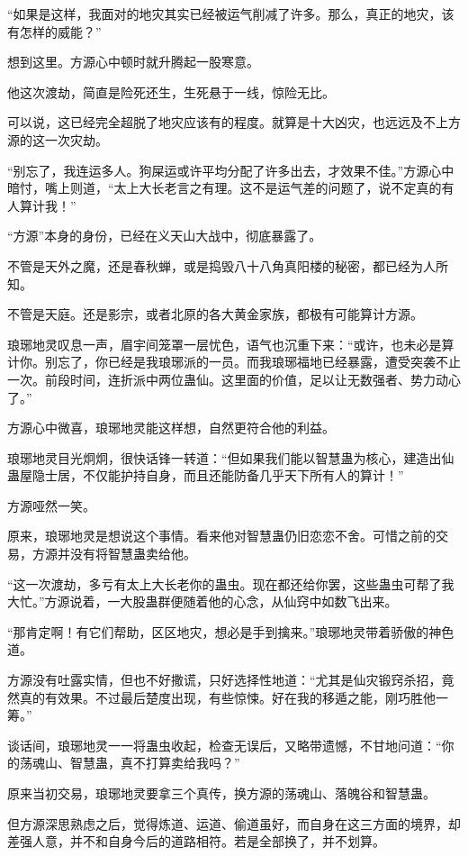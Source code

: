 \begin{this_body}
“如果是这样，我面对的地灾其实已经被运气削减了许多。那么，真正的地灾，该有怎样的威能？”

想到这里。方源心中顿时就升腾起一股寒意。

他这次渡劫，简直是险死还生，生死悬于一线，惊险无比。

可以说，这已经完全超脱了地灾应该有的程度。就算是十大凶灾，也远远及不上方源的这一次灾劫。

“别忘了，我连运多人。狗屎运或许平均分配了许多出去，才效果不佳。”方源心中暗忖，嘴上则道，“太上大长老言之有理。这不是运气差的问题了，说不定真的有人算计我！”

“方源”本身的身份，已经在义天山大战中，彻底暴露了。

不管是天外之魔，还是春秋蝉，或是捣毁八十八角真阳楼的秘密，都已经为人所知。

不管是天庭。还是影宗，或者北原的各大黄金家族，都极有可能算计方源。

琅琊地灵叹息一声，眉宇间笼罩一层忧色，语气也沉重下来：“或许，也未必是算计你。别忘了，你已经是我琅琊派的一员。而我琅琊福地已经暴露，遭受突袭不止一次。前段时间，连折派中两位蛊仙。这里面的价值，足以让无数强者、势力动心了。”

方源心中微喜，琅琊地灵能这样想，自然更符合他的利益。

琅琊地灵目光炯炯，很快话锋一转道：“但如果我们能以智慧蛊为核心，建造出仙蛊屋隐士居，不仅能护持自身，而且还能防备几乎天下所有人的算计！”

方源哑然一笑。

原来，琅琊地灵是想说这个事情。看来他对智慧蛊仍旧恋恋不舍。可惜之前的交易，方源并没有将智慧蛊卖给他。

“这一次渡劫，多亏有太上大长老你的蛊虫。现在都还给你罢，这些蛊虫可帮了我大忙。”方源说着，一大股蛊群便随着他的心念，从仙窍中如数飞出来。

“那肯定啊！有它们帮助，区区地灾，想必是手到擒来。”琅琊地灵带着骄傲的神色道。

方源没有吐露实情，但也不好撒谎，只好选择性地道：“尤其是仙灾锻窍杀招，竟然真的有效果。不过最后楚度出现，有些惊悚。好在我的移遁之能，刚巧胜他一筹。”

谈话间，琅琊地灵一一将蛊虫收起，检查无误后，又略带遗憾，不甘地问道：“你的荡魂山、智慧蛊，真不打算卖给我吗？”

原来当初交易，琅琊地灵要拿三个真传，换方源的荡魂山、落魄谷和智慧蛊。

但方源深思熟虑之后，觉得炼道、运道、偷道虽好，而自身在这三方面的境界，却差强人意，并不和自身今后的道路相符。若是全部换了，并不划算。


\end{this_body}
